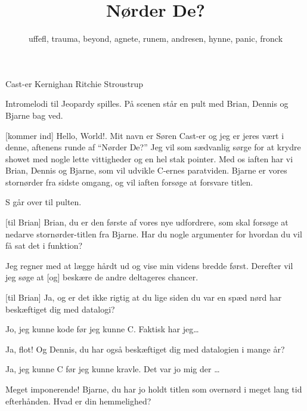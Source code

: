 \documentclass[danish]{article}
\title{Nørder De?}
\author{uffefl, trauma, beyond, agnete, runem, andresen, hynne, panic, fronck}
\begin{document}
\maketitle

\begin{roles}
   Cast-er
   Kernighan
   Ritchie
   Stroustrup
\end{roles}



\begin{sketch}
  
\scene Intromelodi til Jeopardy spilles. På scenen står en pult med Brian,
Dennis og Bjarne bag ved.

[kommer ind] Hello, World!. Mit navn er Søren Cast-er og jeg
er jeres vært i denne, aftenens runde af ``Nørder De?''
Jeg vil som sædvanlig sørge for at krydre showet med nogle lette vittigheder og en hel stak pointer.
Med os iaften har vi Brian, Dennis og Bjarne, som vil udvikle C-ernes
paratviden.  Bjarne er vores stornørder fra sidste omgang, og vil
iaften forsøge at forsvare titlen.

\scene S går over til pulten.

[til Brian] Brian, du er den første af vores nye udfordrere,
som skal forsøge at nedarve stornørder-titlen fra Bjarne.  Har du nogle
argumenter for hvordan du vil få sat det i funktion?

 Jeg regner med at lægge hårdt ud og vise min videns bredde
først.  Derefter vil jeg søge at [og] beskære de andre deltageres chancer.

[til Brian] Ja, og er det ikke rigtig at du lige siden du
var en spæd nørd har beskæftiget dig med datalogi?

 Jo, jeg kunne kode før jeg kunne C. Faktisk har
jeg\ldots{}

 Ja, flot!  Og Dennis, du har også beskæftiget
dig med datalogien i mange år?

Ja, jeg kunne C før jeg kunne kravle.  Det var jo mig der
\ldots{} 

 Meget imponerende!  Bjarne, du har jo holdt
titlen som overnørd i meget lang tid efterhånden.  Hvad er din hemmelighed?


\end{sketch}
\end{document}

